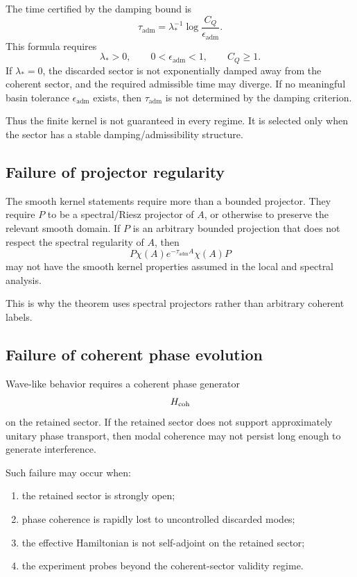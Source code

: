 \documentclass[11pt]{article}
\newcommand{\ta}{\tau_{\mathrm{adm}}}
\newcommand{\epsadm}{\epsilon_{\mathrm{adm}}}
\begin{document}
The time certified by the damping bound is
\begin{equation}
  \ta
  =
  \lambda_\ast^{-1}\log\frac{C_Q}{\epsadm}.
\end{equation}
This formula requires
\begin{equation}
  \lambda_\ast>0,
  \qquad
  0<\epsadm<1,
  \qquad
  C_Q\ge1.
\end{equation}
If \(\lambda_\ast=0\), the discarded sector is not exponentially damped away from the coherent
sector, and the required admissible time may diverge. If no meaningful basin tolerance
\(\epsadm\) exists, then \(\ta\) is not determined by the damping criterion.

Thus the finite kernel is not guaranteed in every regime. It is selected only when the sector
has a stable damping/admissibility structure.

\subsection{Failure of projector regularity}
\label{subsec:failure-projector-regularity}

The smooth kernel statements require more than a bounded projector. They require \(P\) to
be a spectral/Riesz projector of \(A\), or otherwise to preserve the relevant smooth domain.
If \(P\) is an arbitrary bounded projection that does not respect the spectral regularity of
\(A\), then
\begin{equation}
  P\chi(A)e^{-\ta A}\chi(A)P
\end{equation}
may not have the smooth kernel properties assumed in the local and spectral analysis.

This is why the theorem uses spectral projectors rather than arbitrary coherent labels.

\subsection{Failure of coherent phase evolution}
\label{subsec:failure-phase-evolution}

Wave-like behavior requires a coherent phase generator
\begin{equation}
  H_{\rm coh}
\end{equation}
on the retained sector. If the retained sector does not support approximately unitary phase
transport, then modal coherence may not persist long enough to generate interference.

Such failure may occur when:
\begin{enumerate}[label=(\roman*)]
  \item the retained sector is strongly open;
  \item phase coherence is rapidly lost to uncontrolled discarded modes;
  \item the effective Hamiltonian is not self-adjoint on the retained sector;
  \item the experiment probes beyond the coherent-sector validity regime.
\end{enumerate}
\end{document}
